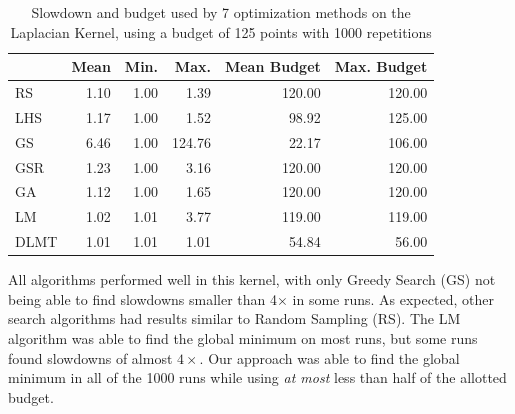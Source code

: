 \documentclass[conference]{IEEEtran}
\begin{document}
\begin{table}[ht]
\centering
\caption{Slowdown and budget used by 7 optimization methods on the Laplacian Kernel, using a budget of 125 points with 1000 repetitions}
\label{tab:gpu_laplacian_compare_budget}
\begingroup\footnotesize
\begin{tabular}{lrrrrr}
  \toprule
 & Mean & Min. & Max. & Mean Budget & Max. Budget \\
  \midrule
RS & 1.10 & 1.00 & 1.39 & 120.00 & 120.00 \\
  LHS & 1.17 & 1.00 & 1.52 & 98.92 & 125.00 \\
  GS & 6.46 & 1.00 & 124.76 & 22.17 & 106.00 \\
  GSR & 1.23 & 1.00 & 3.16 & 120.00 & 120.00 \\
  GA & 1.12 & 1.00 & 1.65 & 120.00 & 120.00 \\
  LM & 1.02 & 1.01 & 3.77 & 119.00 & 119.00 \\
   \rowcolor{red!25}DLMT & 1.01 & 1.01 & 1.01 & 54.84 & 56.00 \\
   \bottomrule
\end{tabular}
\endgroup
\end{table}

All algorithms performed well in this kernel, with only Greedy Search (GS)
not being able to find slowdowns smaller than 4\(\times\) in some runs. As
expected, other search algorithms had results similar to Random Sampling (RS).
The LM algorithm was able to find the global minimum on most runs, but some runs
found slowdowns of almost \(4\times\). Our approach was able to find the global
minimum in all of the 1000 runs while using \emph{at most} less than half of the
allotted budget.
\end{document}
